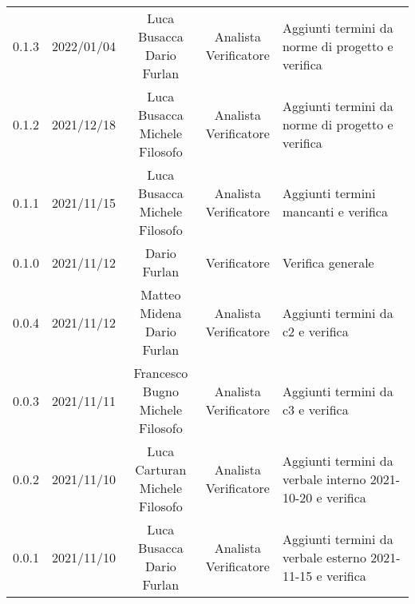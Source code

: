\begin{center}
\begin{longtable}[c]{c | c | c | c | p{5cm}}
		0.1.3 & 2022/01/04 & \Shortunderstack{Luca Busacca\\Dario Furlan} & \Shortunderstack{Analista\\Verificatore} & Aggiunti termini da norme di progetto e verifica\\
		0.1.2 & 2021/12/18 & \Shortunderstack{Luca Busacca\\ Michele Filosofo} & \Shortunderstack{Analista\\Verificatore} & Aggiunti termini da norme di progetto e verifica\\
		0.1.1 & 2021/11/15 & \Shortunderstack{Luca Busacca\\Michele Filosofo} & \Shortunderstack{Analista\\Verificatore} & Aggiunti termini mancanti e verifica\\
		0.1.0 & 2021/11/12 & Dario Furlan & Verificatore & Verifica generale\\
		0.0.4 & 2021/11/12 & \Shortunderstack{Matteo Midena\\Dario Furlan} & \Shortunderstack{Analista\\Verificatore} & Aggiunti termini da c2 e verifica\\
		0.0.3 & 2021/11/11 & \Shortunderstack{Francesco Bugno\\Michele Filosofo} & \Shortunderstack{Analista\\Verificatore} & Aggiunti termini da c3 e verifica\\
		0.0.2 & 2021/11/10 & \Shortunderstack{Luca Carturan\\Michele Filosofo} & \Shortunderstack{Analista\\Verificatore} & Aggiunti termini da verbale interno 2021-10-20 e verifica\\
		0.0.1 & 2021/11/10 & \Shortunderstack{Luca Busacca\\Dario Furlan} & \Shortunderstack{Analista\\Verificatore} & Aggiunti termini da verbale esterno 2021-11-15 e verifica\\
	\end{longtable}
\end{center}